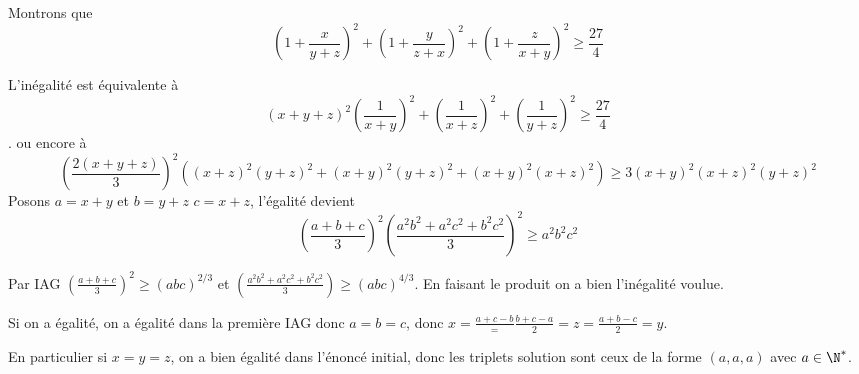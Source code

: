 Montrons que
$$\left(1 + \frac{x}{y + z}\right)^2+\left(1 + \frac{y}{z + x}\right)^2 + \left(1 + \frac{z}{x + y}\right)^2 \ge \frac{27}{4}$$

L'inégalité est équivalente à
$$(x + y + z)^2\left(\frac{1}{x + y}\right)^2 + \left(\frac{1}{x + z}\right)^2 + \left(\frac{1}{y + z}\right)^2 \ge \frac{27}{4}$$.
ou encore à
$$ \left(\frac{2(x + y + z)}{3}\right)^2 ((x + z)^2(y + z)^2 + (x + y)^2(y + z)^2 + (x + y)^2(x + z)^2) \ge 3(x + y)^2(x + z)^2(y + z)^2$$
Posons $a=x+y$ et $b=y+z$ $c=x+z$, l'égalité devient
$$\left(\frac{a + b + c}{3}\right)^2 \left(\frac{a^2b^2 + a^2c^2 + b^2c^2}{3}\right)^2 \ge a^2b^2c^2$$

Par IAG $\left(\frac{a + b + c}{3}\right)^2 \ge (abc)^{2/3}$ et $\left(\frac{a^2b^2 + a^2c^2 + b^2c^2}{3}\right) \ge (abc)^{4/3}$. En faisant le produit on a bien l'inégalité voulue.

Si on a égalité, on a égalité dans la première IAG donc $a = b = c$, donc $x=\frac{a+c-b}=\frac{b+c-a}{2} = z = \frac{a+b-c}{2} = y$.

En particulier si $x = y = z$, on a bien égalité dans l'énoncé initial, donc les triplets solution sont ceux de la forme $(a, a, a)$ avec $a\in \N^*$.